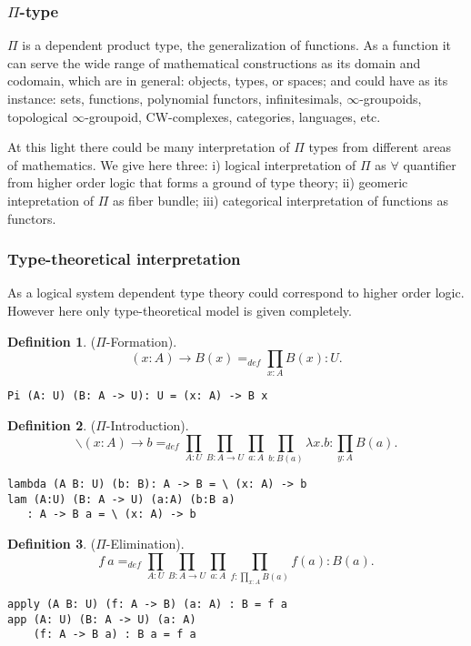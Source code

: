 \documentclass[twocolumn,10pt]{article}
\theoremstyle{definition}
\newtheorem{definition}{Definition}
\begin{document}
\subsubsection{$\Pi$-type}

$\Pi$ is a dependent product type, the generalization of functions.
As a function it can serve the wide range of mathematical constructions as its domain and codomain,
which are in general: objects, types, or spaces; and could have as its
instance: sets, functions, polynomial functors, infinitesimals, $\infty$-groupoids,
topological $\infty$-groupoid, CW-complexes,
categories, languages, etc.

At this light there could be many interpretation of $\Pi$ types from different
areas of mathematics. We give here three: i) logical interpretation of $\Pi$ as
$\forall$ quantifier from higher order logic
that forms a ground of type theory; ii) geomeric intepretation of $\Pi$ as fiber bundle;
iii) categorical interpretation of functions as functors.

\subsubsection*{Type-theoretical interpretation}

As a logical system dependent type theory could correspond to higher order logic.
However here only type-theoretical model is given completely.

\begin{definition} ($\Pi$-Formation).
$$(x: A) \rightarrow B(x) =_{def} \prod_{x:A}B(x) : U.$$
\begin{lstlisting}
Pi (A: U) (B: A -> U): U = (x: A) -> B x
\end{lstlisting}
\end{definition}

\begin{definition} ($\Pi$-Introduction).
$$\backslash (x: A) \rightarrow b =_{def} \prod_{A:U}\prod_{B:A \rightarrow U}\prod_{a: A}\prod_{b:B(a)}\lambda x.b : \prod_{y:A}B(a).$$
\begin{lstlisting}
lambda (A B: U) (b: B): A -> B = \ (x: A) -> b
lam (A:U) (B: A -> U) (a:A) (b:B a)
   : A -> B a = \ (x: A) -> b
\end{lstlisting}
\end{definition}

\begin{definition} ($\Pi$-Elimination).
$$f\ a =_{def} \prod_{A:U}\prod_{B: A \rightarrow U}\prod_{a:A}\prod_{f: \prod_{x:A}B(a)}f(a) : B(a).$$
\begin{lstlisting}
apply (A B: U) (f: A -> B) (a: A) : B = f a
app (A: U) (B: A -> U) (a: A)
    (f: A -> B a) : B a = f a
\end{lstlisting}
\end{definition}
\end{document}
